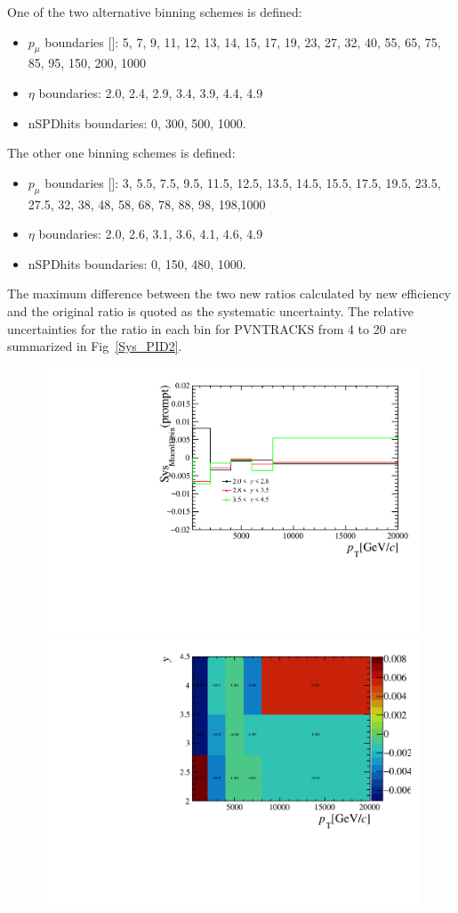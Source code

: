 \begin{itemize}
One of the two alternative binning schemes is defined:
\begin{itemize}
  \item $p_\mu$ boundaries [\gevc]: 5, 7, 9, 11, 12, 13, 14, 15, 17, 19, 23, 27, 32, 40, 55, 65, 75, 85, 95, 150, 200, 1000
  \item $\eta$ boundaries: 2.0, 2.4, 2.9, 3.4, 3.9, 4.4, 4.9
  \item nSPDhits boundaries: 0, 300, 500, 1000.
\end{itemize}

The other one binning schemes is defined:
\begin{itemize}
  \item $p_\mu$ boundaries [\gevc]: 3, 5.5, 7.5, 9.5, 11.5, 12.5, 13.5, 14.5, 15.5, 17.5, 19.5, 23.5, 27.5, 32, 38, 48, 58, 68, 78, 88, 98, 198,1000
  \item $\eta$ boundaries: 2.0, 2.6, 3.1, 3.6, 4.1, 4.6, 4.9
  \item nSPDhits boundaries: 0, 150, 480, 1000.
\end{itemize}
The maximum difference between the two new ratios calculated by new efficiency and the original ratio is quoted as the systematic uncertainty.
The relative uncertainties for the ratio in each bin for PVNTRACKS from 4 to 20 are summarized in Fig~\ref{Sys_PID2}.
\begin{figure}[!tbp]
    \begin{center}
      \includegraphics[width=0.49\linewidth]{pdf/SysPID/n1InBinErrp_point.pdf}
      \includegraphics[width=0.49\linewidth]{pdf/SysPID/n1InBinErrp.pdf}
      \vspace*{-0.5cm}

\end{center}
\end{figure}
\end{itemize}
